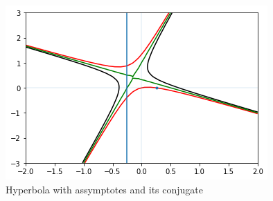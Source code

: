 \begin{enumerate}
\begin{figure}[h]
    \centering
    \includegraphics[width=\columnwidth]{./figs/hyper_asymp/A7_4.png}
    \caption{Hyperbola with assymptotes and its conjugate}
    \label{eq:solutions/40/7/Fig :1}
\end{figure}
\end{enumerate}
